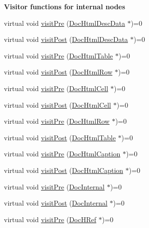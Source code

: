 \begin{Indent}{\bf Visitor functions for internal nodes}
\begin{DoxyCompactItemize}
\item 
virtual void \hyperlink{class_doc_visitor_ab777ab10aa8444e911c26ffa5a13dd80}{visit\+Pre} (\hyperlink{class_doc_html_desc_data}{Doc\+Html\+Desc\+Data} $\ast$)=0
\item 
virtual void \hyperlink{class_doc_visitor_a1d6c104ead1e410666853eeca1348222}{visit\+Post} (\hyperlink{class_doc_html_desc_data}{Doc\+Html\+Desc\+Data} $\ast$)=0
\item 
virtual void \hyperlink{class_doc_visitor_a46be97002c15e24d3c0a0b0b28123d4c}{visit\+Pre} (\hyperlink{class_doc_html_table}{Doc\+Html\+Table} $\ast$)=0
\item 
virtual void \hyperlink{class_doc_visitor_a288d4ff0974bd107ff9b8bb130ffca4b}{visit\+Post} (\hyperlink{class_doc_html_row}{Doc\+Html\+Row} $\ast$)=0
\item 
virtual void \hyperlink{class_doc_visitor_a32086fbe57451f6a8a68a89615048318}{visit\+Pre} (\hyperlink{class_doc_html_cell}{Doc\+Html\+Cell} $\ast$)=0
\item 
virtual void \hyperlink{class_doc_visitor_ab3a1da26976855321849d7d9f14a0b92}{visit\+Post} (\hyperlink{class_doc_html_cell}{Doc\+Html\+Cell} $\ast$)=0
\item 
virtual void \hyperlink{class_doc_visitor_a32db2f9305e92594b3014c600e428c43}{visit\+Pre} (\hyperlink{class_doc_html_row}{Doc\+Html\+Row} $\ast$)=0
\item 
virtual void \hyperlink{class_doc_visitor_af01861d096fb0cff4c7f6d0ea6954fda}{visit\+Post} (\hyperlink{class_doc_html_table}{Doc\+Html\+Table} $\ast$)=0
\item 
virtual void \hyperlink{class_doc_visitor_a6bf4ac1265c14f57b338c17fa02a28bc}{visit\+Pre} (\hyperlink{class_doc_html_caption}{Doc\+Html\+Caption} $\ast$)=0
\item 
virtual void \hyperlink{class_doc_visitor_a1fd56b83af1bfc8fcf28633a6b15968f}{visit\+Post} (\hyperlink{class_doc_html_caption}{Doc\+Html\+Caption} $\ast$)=0
\item 
virtual void \hyperlink{class_doc_visitor_a1f02d37635148eaa50ca604413b2b473}{visit\+Pre} (\hyperlink{class_doc_internal}{Doc\+Internal} $\ast$)=0
\item 
virtual void \hyperlink{class_doc_visitor_ae1078286760f256a6b1423048ab4efe0}{visit\+Post} (\hyperlink{class_doc_internal}{Doc\+Internal} $\ast$)=0
\item 
virtual void \hyperlink{class_doc_visitor_a98077b191b4d115565261f4077319f17}{visit\+Pre} (\hyperlink{class_doc_h_ref}{Doc\+H\+Ref} $\ast$)=0
\item 

\end{DoxyCompactItemize}
\end{Indent}

